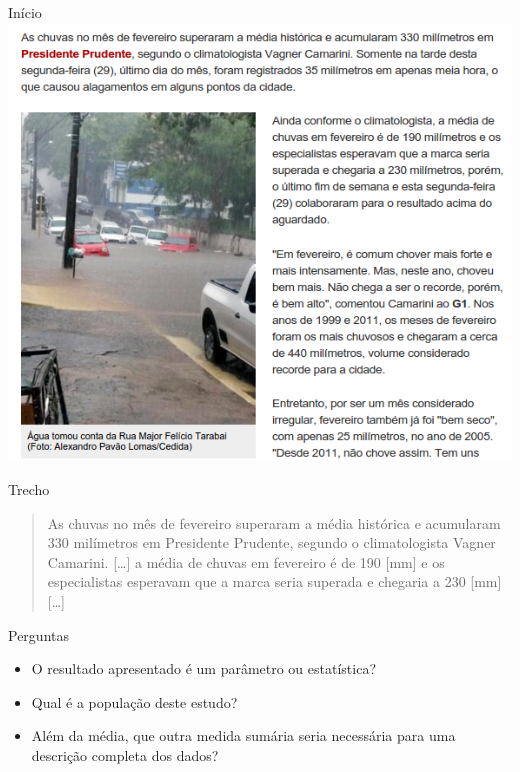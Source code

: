 \documentclass{beamer}
\begin{document}
\begin{frame}{Início}
  \centering \includegraphics[height=.9\textheight]{Revisao1/texto2}
\end{frame}

\begin{frame}{Trecho}
  \begin{quote}
    As chuvas no mês de fevereiro superaram a média histórica e
    acumularam 330 milímetros em Presidente Prudente, segundo o
    climatologista Vagner Camarini. [\ldots] a média de chuvas em
    fevereiro é de 190 [mm] e os especialistas esperavam que a
    marca seria superada e chegaria a 230 [mm] [\ldots]
  \end{quote}
  \begin{block}{Perguntas}
    \begin{itemize}
    \item O resultado apresentado é um parâmetro ou estatística?
    \item Qual é a população deste estudo?
    \item Além da média, que outra medida sumária seria necessária
      para uma descrição completa dos dados?
    \end{itemize}
  \end{block}
\end{frame}
\end{document}
